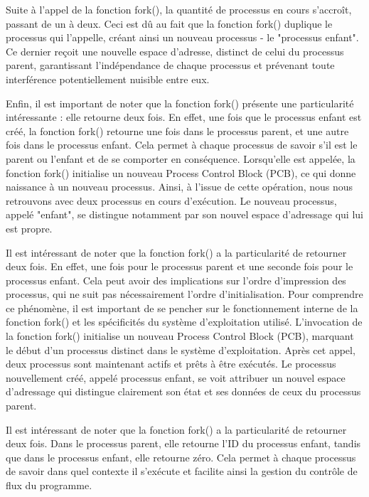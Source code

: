 \documentclass[12pt]{article}
\begin{document}
Suite à l'appel de la fonction fork(), la quantité de processus en cours s'accroît, passant de un à deux. Ceci est dû au fait que la fonction fork() duplique le processus qui l'appelle, créant ainsi un nouveau processus - le "processus enfant". Ce dernier reçoit une nouvelle espace d'adresse, distinct de celui du processus parent, garantissant l'indépendance de chaque processus et prévenant toute interférence potentiellement nuisible entre eux.

Enfin, il est important de noter que la fonction fork() présente une particularité intéressante : elle retourne deux fois. En effet, une fois que le processus enfant est créé, la fonction fork() retourne une fois dans le processus parent, et une autre fois dans le processus enfant. Cela permet à chaque processus de savoir s’il est le parent ou l’enfant et de se comporter en conséquence.
Lorsqu'elle est appelée, la fonction fork() initialise un nouveau Process Control Block (PCB), ce qui donne naissance à un nouveau processus. Ainsi, à l'issue de cette opération, nous nous retrouvons avec deux processus en cours d'exécution. Le nouveau processus, appelé "enfant", se distingue notamment par son nouvel espace d'adressage qui lui est propre. 

Il est intéressant de noter que la fonction fork() a la particularité de retourner deux fois. En effet, une fois pour le processus parent et une seconde fois pour le processus enfant. Cela peut avoir des implications sur l'ordre d'impression des processus, qui ne suit pas nécessairement l'ordre d'initialisation. Pour comprendre ce phénomène, il est important de se pencher sur le fonctionnement interne de la fonction fork() et les spécificités du système d'exploitation utilisé.
L'invocation de la fonction fork() initialise un nouveau Process Control Block (PCB), marquant le début d'un processus distinct dans le système d'exploitation. Après cet appel, deux processus sont maintenant actifs et prêts à être exécutés. Le processus nouvellement créé, appelé processus enfant, se voit attribuer un nouvel espace d'adressage qui distingue clairement son état et ses données de ceux du processus parent.

Il est intéressant de noter que la fonction fork() a la particularité de retourner deux fois. Dans le processus parent, elle retourne l'ID du processus enfant, tandis que dans le processus enfant, elle retourne zéro. Cela permet à chaque processus de savoir dans quel contexte il s'exécute et facilite ainsi la gestion du contrôle de flux du programme.
\end{document}

